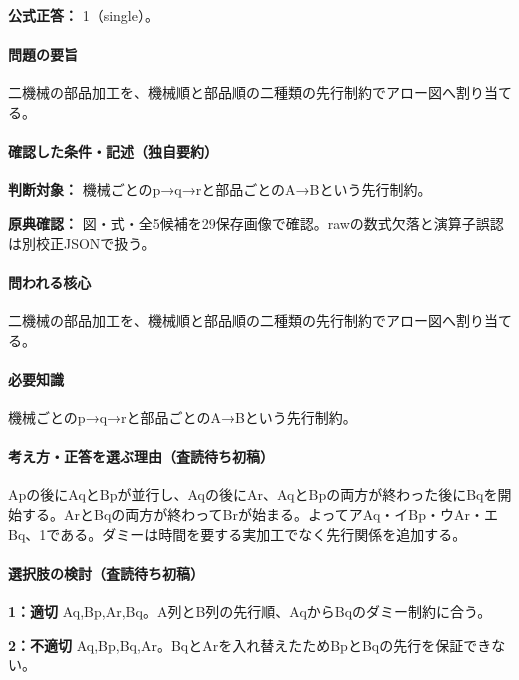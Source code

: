 \textbf{公式正答：} 1（single）。

\paragraph{問題の要旨} 二機械の部品加工を、機械順と部品順の二種類の先行制約でアロー図へ割り当てる。

\paragraph{確認した条件・記述（独自要約）}\mbox{}\par

\noindent\textbf{判断対象：} 機械ごとのp→q→rと部品ごとのA→Bという先行制約。\par

\noindent\textbf{原典確認：} 図・式・全5候補を29保存画像で確認。rawの数式欠落と演算子誤認は別校正JSONで扱う。\par

\paragraph{問われる核心} 二機械の部品加工を、機械順と部品順の二種類の先行制約でアロー図へ割り当てる。

\paragraph{必要知識} 機械ごとのp→q→rと部品ごとのA→Bという先行制約。

\paragraph{考え方・正答を選ぶ理由（査読待ち初稿）} Apの後にAqとBpが並行し、Aqの後にAr、AqとBpの両方が終わった後にBqを開始する。ArとBqの両方が終わってBrが始まる。よってアAq・イBp・ウAr・エBq、1である。ダミーは時間を要する実加工でなく先行関係を追加する。

\paragraph{選択肢の検討（査読待ち初稿）}\mbox{}\par

\noindent\textbf{1：適切} Aq,Bp,Ar,Bq。A列とB列の先行順、AqからBqのダミー制約に合う。\par

\noindent\textbf{2：不適切} Aq,Bp,Bq,Ar。BqとArを入れ替えたためBpとBqの先行を保証できない。\par

